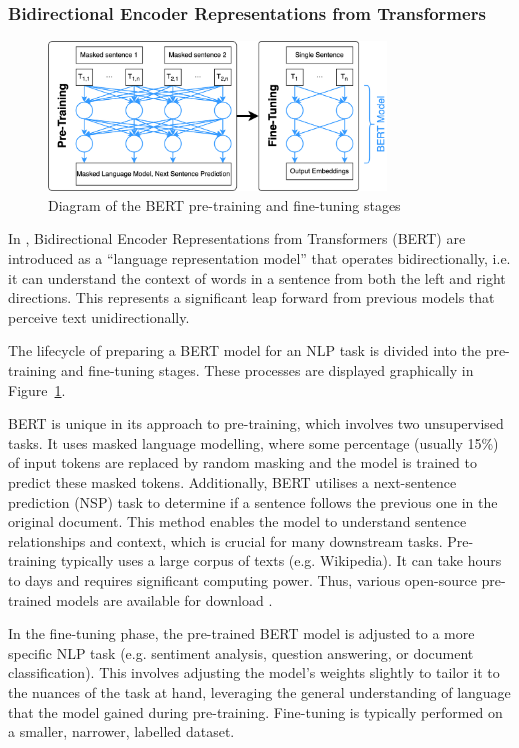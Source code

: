 \documentclass[twocolumn]{article}
\newcommand{\centerimg}[1]{
  \begin{adjustbox}{center} #1 \end{adjustbox}
}
\begin{document}
\subsubsection{Bidirectional Encoder Representations from Transformers}

\begin{figure}[h!]
\caption{Diagram of the BERT pre-training and fine-tuning stages}
\centerimg{\includegraphics[width=0.8\textwidth]{bert.png}}
\label{fig:bert}
\end{figure}

In \textcite{devlin2019}, Bidirectional Encoder Representations from Transformers (BERT) are introduced as a ``language representation model'' that operates bidirectionally, i.e. it can understand the context of words in a sentence from both the left and right directions. This represents a significant leap forward from previous models that perceive text unidirectionally.

The lifecycle of preparing a BERT model for an NLP task is divided into the pre-training and fine-tuning stages. These processes are displayed graphically in Figure~\ref{fig:bert}.

BERT is unique in its approach to pre-training, which involves two unsupervised tasks. It uses masked language modelling, where some percentage (usually 15\%) of input tokens are replaced by random masking and the model is trained to predict these masked tokens. Additionally, BERT utilises a next-sentence prediction (NSP) task to determine if a sentence follows the previous one in the original document. This method enables the model to understand sentence relationships and context, which is crucial for many downstream tasks. Pre-training typically uses a large corpus of texts (e.g. Wikipedia). It can take hours to days and requires significant computing power. Thus, various open-source pre-trained models are available for download \cite{huggingface}.

In the fine-tuning phase, the pre-trained BERT model is adjusted to a more specific NLP task (e.g. sentiment analysis, question answering, or document classification).
This involves adjusting the model's weights slightly to tailor it to the nuances of the task at hand, leveraging the general understanding of language that the model gained during pre-training. Fine-tuning is typically performed on a smaller, narrower, labelled dataset.
\end{document}
